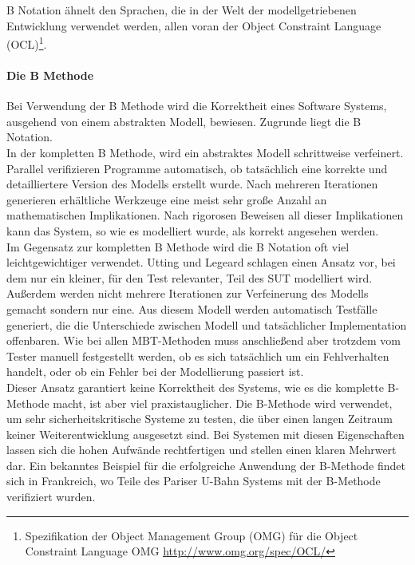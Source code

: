 B Notation ähnelt den Sprachen, die in der Welt der modellgetriebenen Entwicklung verwendet werden, allen voran der Object Constraint Language (OCL)\footnote{Spezifikation der Object Management Group (OMG) für die Object Constraint Language \cite{warmer_object_2004} OMG \url{http://www.omg.org/spec/OCL/}}.

\paragraph{Die B Methode}
\label{sec:bmethod}
Bei Verwendung der B Methode wird die Korrektheit eines Software Systems, ausgehend von einem abstrakten Modell, bewiesen. Zugrunde liegt die B Notation.\\
In der kompletten B Methode, wird ein abstraktes Modell schrittweise verfeinert. Parallel verifizieren Programme automatisch, ob tatsächlich eine korrekte und detailliertere Version des Modells erstellt wurde. Nach mehreren Iterationen generieren erhältliche Werkzeuge eine meist sehr große Anzahl an mathematischen Implikationen. Nach rigorosen Beweisen all dieser Implikationen kann das System, so wie es modelliert wurde, als korrekt angesehen werden.\\
Im Gegensatz zur kompletten B Methode wird die B Notation oft viel leichtgewichtiger verwendet. Utting und Legeard \cite{utting_practical_2007} schlagen einen Ansatz vor, bei dem nur ein kleiner, für den Test relevanter, Teil des \Gls{SUT} modelliert wird. Außerdem werden nicht mehrere Iterationen zur Verfeinerung des Modells gemacht sondern nur eine. Aus diesem Modell werden automatisch Testfälle generiert, die die Unterschiede zwischen Modell und tatsächlicher Implementation offenbaren. Wie bei allen MBT-Methoden muss anschließend aber trotzdem vom Tester manuell festgestellt werden, ob es sich tatsächlich um ein Fehlverhalten handelt, oder ob ein Fehler bei der Modellierung passiert ist.\\
Dieser Ansatz garantiert keine Korrektheit des Systems, wie es die komplette B-Methode macht, ist aber viel praxistauglicher. Die B-Methode wird verwendet, um sehr sicherheitskritische Systeme zu testen, die über einen langen Zeitraum keiner Weiterentwicklung ausgesetzt sind. Bei Systemen mit diesen Eigenschaften lassen sich die hohen Aufwände rechtfertigen und stellen einen klaren Mehrwert dar. Ein bekanntes Beispiel für die erfolgreiche Anwendung der B-Methode findet sich in Frankreich, wo Teile des Pariser U-Bahn Systems mit der B-Methode verifiziert wurden. \cite{lecomte_formal_2007}

